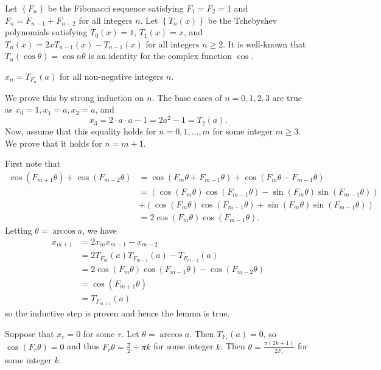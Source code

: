 Let $\left\{F_n\right\}$ be the Fibonacci sequence satisfying $F_1=F_2=1$ and $F_n=F_{n-1}+F_{n-2}$ for all integers $n$. Let $\left\{T_n\left(x\right)\right\}$ be the Tchebyshev polynomials satisfying $T_0\left(x\right)=1$, $T_1\left(x\right)=x$, and $T_n\left(x\right)=2xT_{n-1}\left(x\right)-T_{n-1}\left(x\right)$ for all integers $n\geq2$. It is well-known that $T_n\left(\cos\theta\right)=\cos n\theta$ is an identity for the complex function $\cos$.

\begin{solutionlemma}
$x_n=T_{F_n}\left(a\right)$ for all non-negative integers $n$.
\end{solutionlemma}
\begin{lemmaproof}
We prove this by strong induction on $n$. The base cases of $n=0,1,2,3$ are true as $x_0=1,x_1=a,x_2=a$, and \[x_3=2\cdot a\cdot a-1=2a^2-1=T_2\left(a\right).\] Now, assume that this equality holds for $n=0,1,\ldots,m$ for some integer $m\geq3$. We prove that it holds for $n=m+1$.

First note that
\begin{align*}
	\cos\left(F_{m+1}\theta\right)+\cos\left(F_{m-2}\theta\right)&=\cos\left(F_m\theta+F_{m-1}\theta\right)+\cos\left(F_m\theta-F_{m-1}\theta\right)\\
	&=\left(\cos\left(F_m\theta\right)\cos\left(F_{m-1}\theta\right)-\sin\left(F_m\theta\right)\sin\left(F_{m-1}\theta\right)\right)\\&+\left(\cos\left(F_m\theta\right)\cos\left(F_{m-1}\theta\right)+\sin\left(F_m\theta\right)\sin\left(F_{m-1}\theta\right)\right)\\
	&=2\cos\left(F_m\theta\right)\cos\left(F_{m-1}\theta\right).
\end{align*}
Letting $\theta=\arccos a$, we have
\begin{align*}
	x_{m+1}&=2x_mx_{m-1}-x_{m-2}\\
	&=2T_{F_m}\left(a\right)T_{F_{m-1}}\left(a\right)-T_{F_{m-2}}\left(a\right)\\
	&=2\cos\left(F_m\theta\right)\cos\left(F_{m-1}\theta\right)-\cos\left(F_{m-2}\theta\right)\\
	&=\cos\left(F_{m+1}\theta\right)\\
	&=T_{F_{m+1}}\left(a\right)
\end{align*}
so the inductive step is proven and hence the lemma is true.
\end{lemmaproof}

Suppose that $x_r=0$ for some $r$. Let $\theta=\arccos a$. Then $T_{F_r}\left(a\right)=0$, so $\cos\left(F_r\theta\right)=0$ and thus $F_r\theta=\frac{\pi}{2}+\pi k$ for some integer $k$. Then $\theta=\frac{\pi\left(2k+1\right)}{2F_r}$ for some integer $k$.

